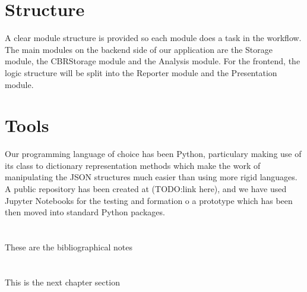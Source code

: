 \section{Structure}
\label{cap1:sec:structure}
A clear module structure is provided so each module does a task in the workflow.
The main modules on the backend side of our application are the Storage module, the CBRStorage module and the Analysis module.
For the frontend, the logic structure will be split into the Reporter module and the Presentation module.

\section{Tools}
\label{cap1:sec:tools}

Our programming language of choice has been Python, particulary making use of its class to dictionary representation methods which make the work of manipulating the JSON structures much easier than using more rigid languages.
A public repository has been created at (TODO:link here), and we have used Jupyter Notebooks for the testing and formation o a prototype which has been then moved into standard Python packages.

\section*{\NotasBibliograficas}
\TocNotasBibliograficas

These are the bibliographical notes
\citep{ldesc2e}

\medskip



\section*{\ProximoCapitulo}
\TocProximoCapitulo

This is the next chapter section

